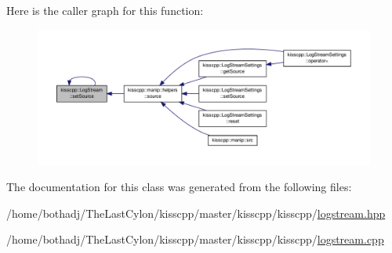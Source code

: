 Here is the caller graph for this function\-:
\nopagebreak
\begin{figure}[H]
\begin{center}
\leavevmode
\includegraphics[width=350pt]{classkisscpp_1_1_log_stream_adcc3d0579fa1a4bcf6649274792b27e0_icgraph}
\end{center}
\end{figure}




The documentation for this class was generated from the following files\-:\begin{DoxyCompactItemize}
\item 
/home/bothadj/\-The\-Last\-Cylon/kisscpp/master/kisscpp/kisscpp/\hyperlink{logstream_8hpp}{logstream.\-hpp}\item 
/home/bothadj/\-The\-Last\-Cylon/kisscpp/master/kisscpp/kisscpp/\hyperlink{logstream_8cpp}{logstream.\-cpp}\end{DoxyCompactItemize}
